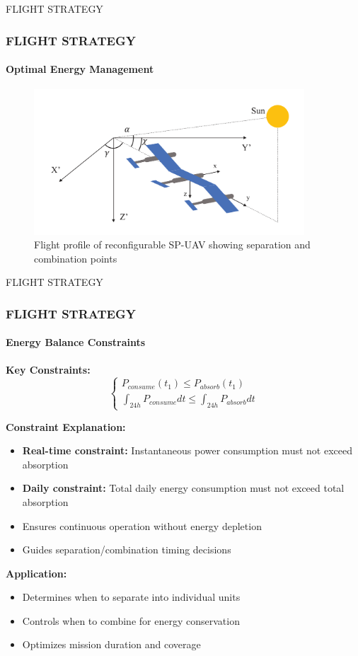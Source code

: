 \documentclass{beamer}
\begin{document}
\begin{frame}{FLIGHT STRATEGY}
    \frametitle{FLIGHT STRATEGY}
    \framesubtitle{Optimal Energy Management}
    
    \begin{figure}
        \centering
        \includegraphics[width=0.9\textwidth]{flight_strategy.png}
        \caption{Flight profile of reconfigurable SP-UAV showing separation and combination points}
        \label{fig:flight_strategy}
    \end{figure}
\end{frame}

\begin{frame}{FLIGHT STRATEGY}
    \frametitle{FLIGHT STRATEGY}
    \framesubtitle{Energy Balance Constraints}
    
    \textbf{Key Constraints:}
    \begin{equation*}
        \begin{cases}
            P_{consume}(t_1) \leq P_{absorb}(t_1) \\
            \int_{24h} P_{consume}dt \leq \int_{24h} P_{absorb}dt
        \end{cases}
    \end{equation*}
    
    \vspace{0.5cm}
    \textbf{Constraint Explanation:}
    \begin{itemize}
        \item \textbf{Real-time constraint:} Instantaneous power consumption must not exceed absorption
        \item \textbf{Daily constraint:} Total daily energy consumption must not exceed total absorption
        \item Ensures continuous operation without energy depletion
        \item Guides separation/combination timing decisions
    \end{itemize}
    
    \vspace{0.3cm}
    \textbf{Application:}
    \begin{itemize}
        \item Determines when to separate into individual units
        \item Controls when to combine for energy conservation
        \item Optimizes mission duration and coverage
    \end{itemize}
\end{frame}
\end{document}
